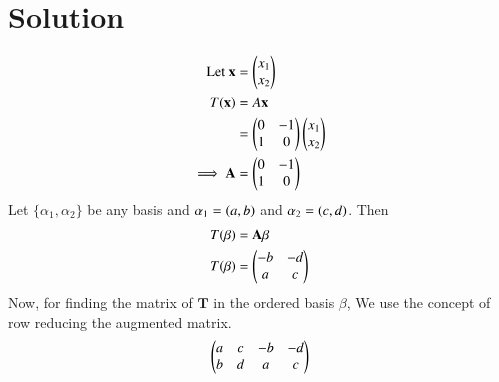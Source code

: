 \documentclass[journal,12pt,twocolumn]{IEEEtran}
\begin{document}
\section{Solution}
\begin{align}
    \text{Let } \mathbf{x} &= \begin{pmatrix}x_1 \\ x_2\end{pmatrix} \\
    T(\mathbf{x}) &= A\mathbf{x}\\
     &= \begin{pmatrix}0 & -1 \\ 1 & 0\end{pmatrix}\begin{pmatrix}x_1 \\ x_2\end{pmatrix}\\
     \implies \mathbf{A} &= \begin{pmatrix}0 & -1 \\ 1 & 0\end{pmatrix}
\end{align}
Let $\{\alpha_1,\alpha_2\}$ be any basis and $\alpha_1=\left(a,b\right)$ and $\alpha_2=\left(c,d\right)$. Then 
\begin{align}
    T(\beta) &= \mathbf{A}\beta\\ 
    T(\beta) &= \begin{pmatrix}-b & -d \\ a & c\end{pmatrix} 
\end{align}
Now, for finding the matrix of $\mathbf{T}$ in the ordered basis $\beta$, We use the concept of row reducing the augmented matrix.
\begin{align}
    \begin{pmatrix}a & c & -b & -d \\ b & d & a & c\end{pmatrix}
\end{align}
\end{document}
